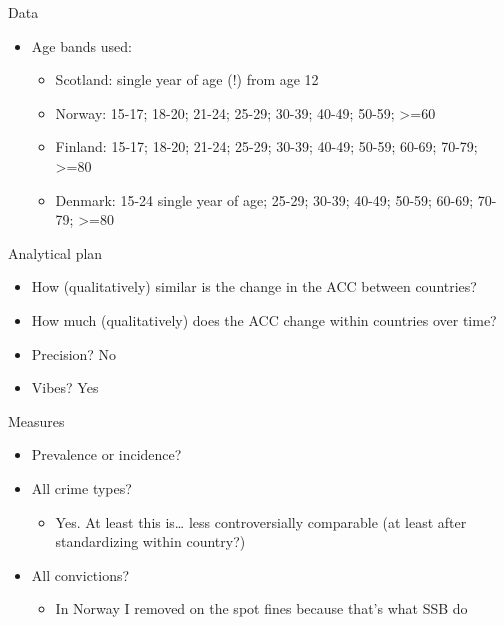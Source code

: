 \documentclass[
  ignorenonframetext,
]{beamer}
\providecommand{\tightlist}{%
  \setlength{\itemsep}{0pt}\setlength{\parskip}{0pt}}\usepackage{longtable,booktabs,array}
\begin{document}
\begin{frame}{Data}
\protect\hypertarget{data-1}{}
\begin{itemize}
\item
  Age bands used:

  \begin{itemize}
  \item
    Scotland: single year of age (!) from age 12
  \item
    Norway: 15-17; 18-20; 21-24; 25-29; 30-39; 40-49; 50-59;
    \textgreater=60
  \item
    Finland: 15-17; 18-20; 21-24; 25-29; 30-39; 40-49; 50-59; 60-69;
    70-79; \textgreater=80
  \item
    Denmark: 15-24 single year of age; 25-29; 30-39; 40-49; 50-59;
    60-69; 70-79; \textgreater=80
  \end{itemize}
\end{itemize}
\end{frame}

\begin{frame}{Analytical plan}
\protect\hypertarget{analytical-plan}{}
\begin{itemize}
\tightlist
\item
  How (qualitatively) similar is the change in the ACC between
  countries?
\item
  How much (qualitatively) does the ACC change within countries over
  time?
\item
  Precision? No
\item
  Vibes? Yes
\end{itemize}
\end{frame}

\begin{frame}{Measures}
\protect\hypertarget{measures}{}
\begin{itemize}
\tightlist
\item
  Prevalence or incidence?
\item
  All crime types?

  \begin{itemize}
  \tightlist
  \item
    Yes. At least this is\ldots{} less controversially comparable (at
    least after standardizing within country?)
  \end{itemize}
\item
  All convictions?

  \begin{itemize}
  \tightlist
  \item
    In Norway I removed on the spot fines because that's what SSB do
  \end{itemize}
\end{itemize}
\end{frame}
\end{document}
